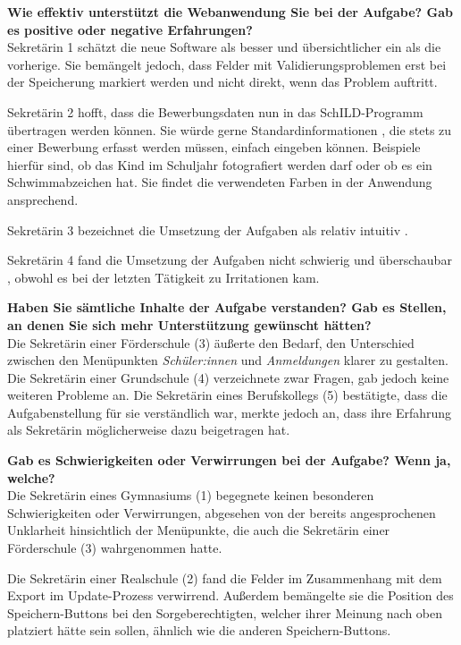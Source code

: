 \textbf{Wie effektiv unterstützt die Webanwendung Sie bei der Aufgabe?  Gab es positive oder negative Erfahrungen?}\\
Sekretärin 1 schätzt die neue Software als besser und übersichtlicher ein als die vorherige. Sie bemängelt jedoch, dass Felder mit Validierungsproblemen erst bei der Speicherung markiert werden und nicht direkt, wenn das Problem auftritt.

Sekretärin 2 hofft, dass die Bewerbungsdaten nun in das SchILD-Programm übertragen werden können. Sie würde gerne \glqq Standardinformationen\grqq{} , die stets zu einer Bewerbung erfasst werden müssen, einfach eingeben können. Beispiele hierfür sind, ob das Kind im Schuljahr fotografiert werden darf oder ob es ein Schwimmabzeichen hat. Sie findet die verwendeten Farben in der Anwendung ansprechend.

Sekretärin 3 bezeichnet die Umsetzung der Aufgaben als \glqq relativ intuitiv\grqq{} .

Sekretärin 4 fand die Umsetzung der Aufgaben \glqq nicht schwierig\grqq{}  und \glqq überschaubar\grqq{} , obwohl es bei der letzten Tätigkeit zu Irritationen kam.

\textbf{Haben Sie sämtliche Inhalte der Aufgabe verstanden? Gab es Stellen, an denen Sie sich mehr Unterstützung gewünscht hätten?}\\
Die Sekretärin einer Förderschule (3) äußerte den Bedarf, den Unterschied zwischen den Menüpunkten \textit{Schüler:innen} und \textit{Anmeldungen} klarer zu gestalten. Die Sekretärin einer Grundschule (4) verzeichnete zwar Fragen, gab jedoch keine weiteren Probleme an. Die Sekretärin eines Berufskollegs (5) bestätigte, dass die Aufgabenstellung für sie verständlich war, merkte jedoch an, dass ihre Erfahrung als Sekretärin möglicherweise dazu beigetragen hat.

\textbf{Gab es Schwierigkeiten oder Verwirrungen bei der Aufgabe? Wenn ja, welche?}\\
Die Sekretärin eines Gymnasiums (1) begegnete keinen besonderen Schwierigkeiten oder Verwirrungen, abgesehen von der bereits angesprochenen Unklarheit hinsichtlich der Menüpunkte, die auch die Sekretärin einer Förderschule (3) wahrgenommen hatte.

Die Sekretärin einer Realschule (2) fand die Felder im Zusammenhang mit dem Export im Update-Prozess verwirrend. Außerdem bemängelte sie die Position des Speichern-Buttons bei den Sorgeberechtigten, welcher ihrer Meinung nach oben platziert hätte sein sollen, ähnlich wie die anderen Speichern-Buttons.

